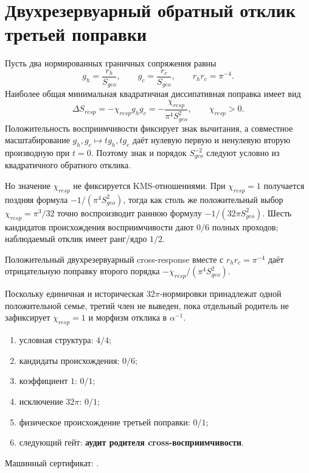 \chapter{Двухрезервуарный обратный отклик третьей поправки}
\label{ch:v10-alpha-pi4-inverse-response}
Пусть два нормированных граничных сопряжения равны
\begin{equation}g_h=\frac{r_h}{S_{geo}},\qquad g_c=\frac{r_c}{S_{geo}},
\qquad r_hr_c=\pi^{-4}.\end{equation}
Наиболее общая минимальная квадратичная диссипативная поправка имеет вид
\begin{equation}\Delta S_{resp}=-\chi_{resp}g_hg_c
=-\frac{\chi_{resp}}{\pi^4S_{geo}^2},\qquad \chi_{resp}>0.\end{equation}
Положительность восприимчивости фиксирует знак вычитания, а совместное
масштабирование $g_h,g_c\mapsto t g_h,t g_c$ даёт нулевую первую и ненулевую
вторую производную при $t=0$. Поэтому знак и порядок $S_{geo}^{-2}$ следуют
условно из квадратичного обратного отклика.

Но значение $\chi_{resp}$ не фиксируется KMS-отношениями. При
$\chi_{resp}=1$ получается поздняя формула
$-1/(\pi^4S_{geo}^2)$, тогда как столь же положительный выбор
$\chi_{resp}=\pi^3/32$ точно воспроизводит раннюю формулу
$-1/(32\pi S_{geo}^2)$. Шесть кандидатов происхождения восприимчивости дают
$0/6$ полных проходов; наблюдаемый отклик имеет ранг/ядро $1/2$.

\begin{theorem}
Положительный двухрезервуарный cross-response вместе с
$r_hr_c=\pi^{-4}$ даёт отрицательную поправку второго порядка
$-\chi_{resp}/(\pi^4S_{geo}^2)$.
\end{theorem}
\begin{nogocriterion}
Поскольку единичная и историческая $32\pi$-нормировки принадлежат одной
положительной семье, третий член не выведен, пока отдельный родитель не
зафиксирует $\chi_{resp}=1$ и морфизм отклика в $\alpha^{-1}$.
\end{nogocriterion}
\begin{protocol}\begin{enumerate}\item условная структура: \textbf{$4/4$};
\item кандидаты происхождения: \textbf{$0/6$};\item коэффициент $1$: \textbf{$0/1$};
\item исключение $32\pi$: \textbf{$0/1$};\item физическое происхождение третьей поправки: \textbf{$0/1$};
\item следующий гейт: \textbf{аудит родителя cross-восприимчивости}.\end{enumerate}\end{protocol}
Машинный сертификат: .